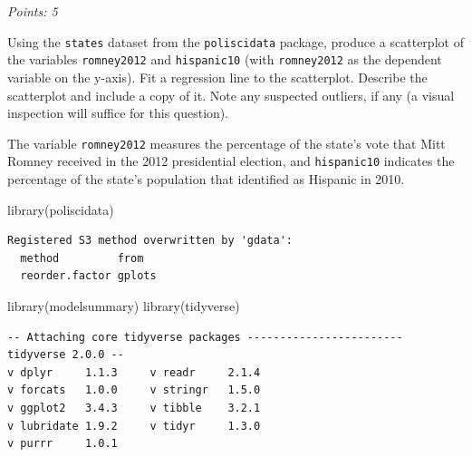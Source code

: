 \documentclass[
  letterpaper,
  DIV=11,
  numbers=noendperiod]{scrartcl}
\newenvironment{Shaded}{\begin{snugshade}}{\end{snugshade}}
\newcommand{\FunctionTok}[1]{\textcolor[rgb]{0.28,0.35,0.67}{#1}}
\newcommand{\NormalTok}[1]{\textcolor[rgb]{0.00,0.23,0.31}{#1}}
\begin{document}
\emph{Points: 5}

Using the \texttt{states} dataset from the \texttt{poliscidata} package,
produce a scatterplot of the variables \texttt{romney2012} and
\texttt{hispanic10} (with \texttt{romney2012} as the dependent variable
on the y-axis). Fit a regression line to the scatterplot. Describe the
scatterplot and include a copy of it. Note any suspected outliers, if
any (a visual inspection will suffice for this question).

\begin{tcolorbox}[enhanced jigsaw, coltitle=black, colframe=quarto-callout-note-color-frame, breakable, bottomrule=.15mm, bottomtitle=1mm, colback=white, left=2mm, toptitle=1mm, arc=.35mm, title=\textcolor{quarto-callout-note-color}{\faInfo}\hspace{0.5em}{Note}, colbacktitle=quarto-callout-note-color!10!white, titlerule=0mm, rightrule=.15mm, toprule=.15mm, leftrule=.75mm, opacitybacktitle=0.6, opacityback=0]

The variable \texttt{romney2012} measures the percentage of the state's
vote that Mitt Romney received in the 2012 presidential election, and
\texttt{hispanic10} indicates the percentage of the state's population
that identified as Hispanic in 2010.

\end{tcolorbox}

\begin{Shaded}
\begin{Highlighting}[]
\FunctionTok{library}\NormalTok{(poliscidata)}
\end{Highlighting}
\end{Shaded}

\begin{verbatim}
Registered S3 method overwritten by 'gdata':
  method         from  
  reorder.factor gplots
\end{verbatim}

\begin{Shaded}
\begin{Highlighting}[]
\FunctionTok{library}\NormalTok{(modelsummary)}
\FunctionTok{library}\NormalTok{(tidyverse)}
\end{Highlighting}
\end{Shaded}

\begin{verbatim}
-- Attaching core tidyverse packages ------------------------ tidyverse 2.0.0 --
v dplyr     1.1.3     v readr     2.1.4
v forcats   1.0.0     v stringr   1.5.0
v ggplot2   3.4.3     v tibble    3.2.1
v lubridate 1.9.2     v tidyr     1.3.0
v purrr     1.0.1     
\end{verbatim}
\end{document}
